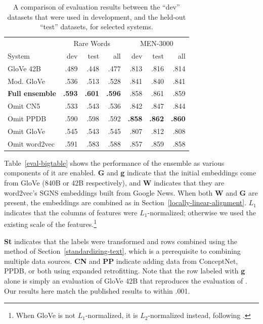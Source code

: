 \documentclass[11pt,letterpaper]{article}
\begin{document}
\begin{table}[t]
\footnotesize
\centering
\begin{tabular}{l|rrr|rrr}
\toprule
                   & \multicolumn{3}{|c|}{Rare Words} & \multicolumn{3}{|c}{MEN-3000} \\
System             &       dev &     test &      all &      dev &     test &      all \\
\midrule
GloVe 42B          &      .489 &     .448 &     .477 &     .813 &     .816 &     .814 \\
Mod. GloVe         &      .536 &     .513 &     .528 &     .841 &     .840 &     .841 \\
\bf Full ensemble  & \bf  .593 & \bf .601 & \bf .596 &     .858 &     .861 &     .859 \\
Omit CN5           &      .533 &     .543 &     .536 &     .842 &     .847 &     .844 \\
Omit PPDB          &      .590 &     .598 &     .592 & \bf .858 & \bf .862 & \bf .860 \\
Omit GloVe         &      .545 &     .543 &     .545 &     .807 &     .812 &     .808 \\
Omit word2vec      &      .591 &     .583 &     .588 &     .857 &     .859 &     .858 \\
\bottomrule
\end{tabular}

\caption{
    A comparison of evaluation results between the ``dev'' datasets that were
    used in development, and the held-out ``test'' datasets, for selected systems.
}
\label{eval-dev-test}
\end{table}


Table~\ref{eval-bigtable} shows the performance of the ensemble as various
components of it are enabled. {\bf G} and {\bf g} indicate that the initial
embeddings come from GloVe (840B or 42B respectively), and {\bf W} indicates
that they are word2vec's SGNS embeddings built from Google News. When both
{\bf W} and {\bf G} are present, the embeddings are combined as in
Section~\ref{locally-linear-alignment}. $L_1$ indicates that the columns of
features were $L_1$-normalized; otherwise we used the existing scale of the
features.\footnote{
    When GloVe is not $L_1$-normalized, it is $L_2$-normalized instead,
    following .
}

{\bf St} indicates that the labels were transformed and rows combined using the
method of Section~\ref{standardizing-text}, which is a prerequisite to combining
multiple data sources. {\bf CN} and {\bf PP} indicate adding data from
ConceptNet, PPDB, or both using expanded retrofitting.
Note that the row labeled with {\bf g} alone is simply an evaluation of GloVe
42B that reproduces the evaluation of . Our results
here match the published results to within .001.
\end{document}
